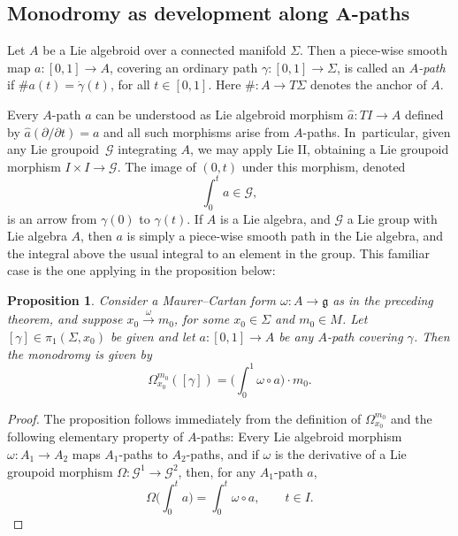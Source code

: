 \documentclass[11pt]{article}
\numberwithin{equation}{section}
\numberwithin{equation}{section}
\newtheorem{Proposition}[Theorem]{Proposition}
\newcommand\integral{\int}
\begin{document}
\subsection*{Monodromy as development along $\boldsymbol{A}$-paths}

Let $A$ be a Lie algebroid over a connected manifold $\Sigma $. Then a
piece-wise smooth map $a \colon [0,1] \allowbreak\rightarrow A$, covering an
ordinary path $\gamma \colon [0,1] \rightarrow \Sigma $, is called an
{\it $A$-path} if $\# a(t) = \dot \gamma(t)$, for all $t \in
[0,1]$. Here $\# \colon A \rightarrow T \Sigma $ denotes the anchor of
$A$.

Every $A$-path $a$ can be understood as Lie algebroid morphism $\hat a
\colon {T}I \rightarrow A$ defined by $\hat a (\partial/\partial t)=a$
and all such morphisms arise from $A$-paths. In~particular, given any
Lie groupoid~${\mathcal G} $ integrating $A$, we may apply Lie II,
obtaining a Lie groupoid morphism $I \times I \rightarrow {\mathcal G}
$. The image of $(0, t)$ under this morphism, denoted
\begin{equation*}
\integral_0^t a \in {\mathcal G},
\end{equation*} is an arrow from $\gamma(0)$ to $\gamma(t)$. If $A$ is
a Lie algebra, and ${\mathcal G} $ a Lie group with Lie algebra $A$, then
$a$ is simply a piece-wise smooth path in the Lie algebra, and the
integral above the usual integral to an element in the group. This
familiar case is the one applying in the proposition below:

\begin{Proposition}%
Consider a Maurer--Cartan form $\omega \colon A
 \rightarrow {\mathfrak g} $ as in the preceding theorem, and suppose
 $x_0\xrightarrow{\omega}m_0$, for some $x_0 \in \Sigma $ and
 $m_0 \in M$. Let $[\gamma] \in \pi_1(\Sigma,x_0)$ be given and let
 $a \colon [0,1]\rightarrow A$ be {\em any} $A$-path covering
 $\gamma $. Then the monodromy is given by
 \[
 \Omega_{x_0}^{m_0}([\gamma])=\bigg(\integral_0^1 \omega \circ a\bigg)\cdot m_0.
\]
\end{Proposition}
%
\begin{proof} The proposition follows immediately from the definition
of $\Omega_{x_0}^{m_0}$ and the following ele\-mentary property of
$A$-paths: Every Lie algebroid morphism $\omega \colon A_1 \rightarrow
A_2$ maps $A_1$-paths to $A_2$-paths, and if $\omega $ is the
derivative of a Lie groupoid morphism $\Omega \colon {\mathcal G}^1
\rightarrow {\mathcal G}^2$, then, for any $A_1$-path $a$,
 \begin{equation*}
 \Omega \bigg(\integral_0^t a\bigg) =
\integral_0^t \omega \circ a, \qquad t \in I.\tag*{\qed}
 \end{equation*}\renewcommand{\qed}{}
\end{proof}
\end{document}
